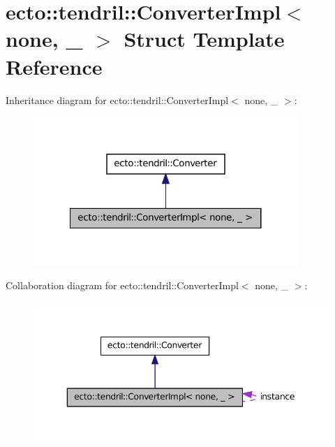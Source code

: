 \hypertarget{structecto_1_1tendril_1_1ConverterImpl_3_01none_00_01___01_4}{\section{ecto\-:\-:tendril\-:\-:\-Converter\-Impl$<$ none, \-\_\- $>$ \-Struct \-Template \-Reference}
\label{structecto_1_1tendril_1_1ConverterImpl_3_01none_00_01___01_4}
}


\-Inheritance diagram for ecto\-:\-:tendril\-:\-:\-Converter\-Impl$<$ none, \-\_\- $>$\-:\nopagebreak
\begin{figure}[H]
\begin{center}
\leavevmode
\includegraphics[width=284pt]{structecto_1_1tendril_1_1ConverterImpl_3_01none_00_01___01_4__inherit__graph}
\end{center}
\end{figure}


\-Collaboration diagram for ecto\-:\-:tendril\-:\-:\-Converter\-Impl$<$ none, \-\_\- $>$\-:\nopagebreak
\begin{figure}[H]
\begin{center}
\leavevmode
\includegraphics[width=346pt]{structecto_1_1tendril_1_1ConverterImpl_3_01none_00_01___01_4__coll__graph}
\end{center}
\end{figure}

